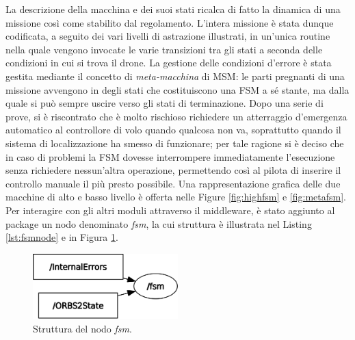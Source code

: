 La descrizione della macchina e dei suoi stati ricalca di fatto la dinamica di una missione così come stabilito dal regolamento. L'intera missione è stata dunque codificata, a seguito dei vari livelli di astrazione illustrati, in un'unica routine nella quale vengono invocate le varie transizioni tra gli stati a seconda delle condizioni in cui si trova il drone. La gestione delle condizioni d'errore è stata gestita mediante il concetto di \emph{meta-macchina} di MSM: le parti pregnanti di una missione avvengono in degli stati che costituiscono una FSM a sé stante, ma dalla quale si può sempre uscire verso gli stati di terminazione. Dopo una serie di prove, si è riscontrato che è molto rischioso richiedere un atterraggio d'emergenza automatico al controllore di volo quando qualcosa non va, soprattutto quando il sistema di localizzazione ha smesso di funzionare; per tale ragione si è deciso che in caso di problemi la FSM dovesse interrompere immediatamente l'esecuzione senza richiedere nessun'altra operazione, permettendo così al pilota di inserire il controllo manuale il più presto possibile. Una rappresentazione grafica delle due macchine di alto e basso livello è offerta nelle Figure \ref{fig:highfsm} e \ref{fig:metafsm}.\\
Per interagire con gli altri moduli attraverso il middleware, è stato aggiunto al package un nodo denominato \emph{fsm}, la cui struttura è illustrata nel Listing \ref{lst:fsmnode} e in Figura \ref{fig:fsmnode}.
\newpage

\begin{figure}
    \centering
    \includegraphics[width=0.5\textwidth]{figs/chapter3/fsm.png}
    \caption{Struttura del nodo \emph{fsm}.}
    \label{fig:fsmnode}
\end{figure}

